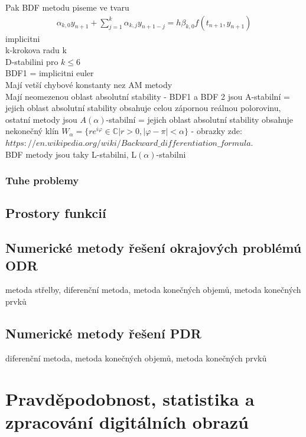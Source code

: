 \documentclass[a4]{report}
\theoremstyle{definition}
\begin{document}
{Pak BDF metodu piseme ve tvaru
\begin{align}
\alpha_{k,0} y_{n+1} + \sum _{j=1}^{k}\alpha_{k,j} y_{n+1-j} = h \beta _{k,0}f(t_{n+1},y_{n+1})
\end{align}
implicitni \\
k-krokova  radu k \\
D-stabilini pro $k \leq 6$ \\
BDF1 = implicitni euler \\
Mají vetší chybové konstanty nez AM metody \\
Mají neomezenou oblast absolutní stability - BDF1 a BDF 2 jsou A-stabilní = jejich oblast absolutní stability obsahuje celou zápornou reálnou polorovinu, ostatní metody jsou $A(\alpha)$-stabilní = jejich oblast absolutní stability obsahuje nekonečný klín $W_{\alpha}=\lbrace re^{i \varphi} \in \mathbb{C} | r>0, \vert \varphi - \pi \vert < \alpha \rbrace$  - obrazky zde: $https://en.wikipedia.org/wiki/Backward\_differentiation\_formula$. \\
BDF metody jsou taky L-stabilni, L$(\alpha)$-stabilni 





\subsection{Tuhe problemy}



\section{Prostory funkcií}

\section{Numerické metody řešení okrajových problémú ODR}
metoda střelby, diferenční metoda, metoda konečných objemů, metoda konečných prvků

\section{Numerické metody řešení PDR}
diferenční metoda, metoda konečných objemů, metoda konečných prvků

\chapter{Pravděpodobnost, statistika a zpracování digitálních obrazú}
}
\end{document}
